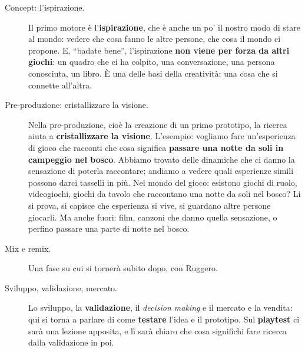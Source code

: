 \begin{description}
  \item[Concept: l'ispirazione.] Il primo motore è l'\textbf{ispirazione}, che è
        anche un po' il nostro modo di stare al mondo: vedere che cosa fanno le altre
        persone, che cosa il mondo ci propone. E, ``badate bene'', l'ispirazione
        \textbf{non viene per forza da altri giochi}: un quadro che ci ha colpito, una
        conversazione, una persona conosciuta, un libro. È una delle basi della
        creatività: una cosa che si connette all'altra.
  \item[Pre-produzione: cristallizzare la visione.] Nella pre-produzione, cioè la
        creazione di un primo prototipo, la ricerca aiuta a \textbf{cristallizzare la
        visione}. L'esempio: vogliamo fare un'esperienza di gioco che racconti che
        cosa significa \textbf{passare una notte da soli in campeggio nel bosco}.
        Abbiamo trovato delle dinamiche che ci danno la sensazione di poterla
        raccontare; andiamo a vedere quali esperienze simili possono darci tasselli in
        più. Nel mondo del gioco: esistono giochi di ruolo, videogiochi, giochi da
        tavolo che raccontano una notte da soli nel bosco? Li si prova, si capisce
        che esperienza si vive, si guardano altre persone giocarli. Ma anche fuori:
        film, canzoni che danno quella sensazione, o perfino passare una parte di
        notte nel bosco.
  \item[Mix e remix.] Una fase su cui si tornerà subito dopo, con Ruggero.
  \item[Sviluppo, validazione, mercato.] Lo sviluppo, la \textbf{validazione}, il
        \emph{decision making} e il mercato e la vendita: qui si torna a parlare di
        come \textbf{testare} l'idea e il prototipo. Sul \textbf{playtest} ci sarà una
        lezione apposita, e lì sarà chiaro che cosa significhi fare ricerca dalla
        validazione in poi.
\end{description}

